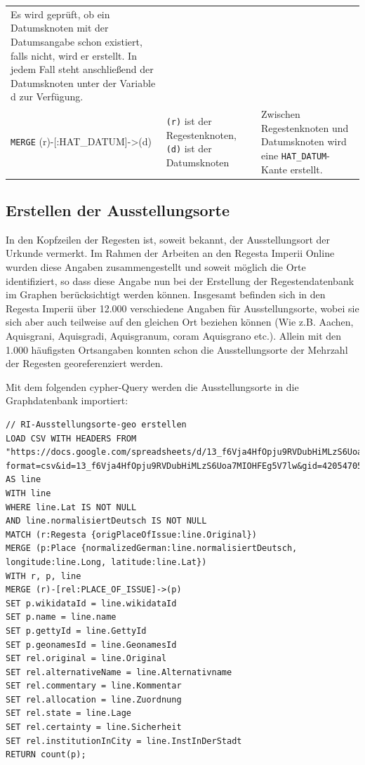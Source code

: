 \documentclass[ngerman,]{scrreprt}
\begin{document}
\begin{longtable}[]{@{}lll@{}}
\begin{minipage}[t]{0.11\columnwidth}
Es wird geprüft, ob ein Datumsknoten mit der Datumsangabe schon existiert, falls nicht, wird er erstellt. In jedem Fall steht anschließend der Datumsknoten unter der Variable d zur Verfügung.\strut
\end{minipage}\tabularnewline
\begin{minipage}[t]{0.13\columnwidth}\raggedright\strut
\texttt{MERGE} (r)-{[}:HAT\_DATUM{]}-\textgreater{}(d)\strut
\end{minipage} & \begin{minipage}[t]{0.09\columnwidth}\raggedright\strut
\texttt{(r)} ist der Regestenknoten, \texttt{(d)} ist der Datumsknoten\strut
\end{minipage} & \begin{minipage}[t]{0.11\columnwidth}\raggedright\strut
Zwischen Regestenknoten und Datumsknoten wird eine \texttt{HAT\_DATUM}-Kante erstellt.\strut
\end{minipage}\tabularnewline
\bottomrule
\end{longtable}

\subsection{Erstellen der Ausstellungsorte}\label{erstellen-der-ausstellungsorte}

In den Kopfzeilen der Regesten ist, soweit bekannt, der Ausstellungsort der Urkunde vermerkt. Im Rahmen der Arbeiten an den Regesta Imperii Online wurden diese Angaben zusammengestellt und soweit möglich die Orte identifiziert, so dass diese Angabe nun bei der Erstellung der Regestendatenbank im Graphen berücksichtigt werden können. Insgesamt befinden sich in den Regesta Imperii über 12.000 verschiedene Angaben für Ausstellungsorte, wobei sie sich aber auch teilweise auf den gleichen Ort beziehen können (Wie z.B. Aachen, Aquisgrani, Aquisgradi, Aquisgranum, coram Aquisgrano etc.). Allein mit den 1.000 häufigsten Ortsangaben konnten schon die Ausstellungsorte der Mehrzahl der Regesten georeferenziert werden.

Mit dem folgenden cypher-Query werden die Ausstellungsorte in die Graphdatenbank importiert:

\begin{verbatim}
// RI-Ausstellungsorte-geo erstellen
LOAD CSV WITH HEADERS FROM "https://docs.google.com/spreadsheets/d/13_f6Vja4HfOpju9RVDubHiMLzS6Uoa7MIOHFEg5V7lw/export?format=csv&id=13_f6Vja4HfOpju9RVDubHiMLzS6Uoa7MIOHFEg5V7lw&gid=420547059" AS line
WITH line
WHERE line.Lat IS NOT NULL
AND line.normalisiertDeutsch IS NOT NULL
MATCH (r:Regesta {origPlaceOfIssue:line.Original})
MERGE (p:Place {normalizedGerman:line.normalisiertDeutsch, longitude:line.Long, latitude:line.Lat})
WITH r, p, line
MERGE (r)-[rel:PLACE_OF_ISSUE]->(p)
SET p.wikidataId = line.wikidataId
SET p.name = line.name
SET p.gettyId = line.GettyId
SET p.geonamesId = line.GeonamesId
SET rel.original = line.Original
SET rel.alternativeName = line.Alternativname
SET rel.commentary = line.Kommentar
SET rel.allocation = line.Zuordnung
SET rel.state = line.Lage
SET rel.certainty = line.Sicherheit
SET rel.institutionInCity = line.InstInDerStadt
RETURN count(p);
\end{verbatim}
\end{document}
